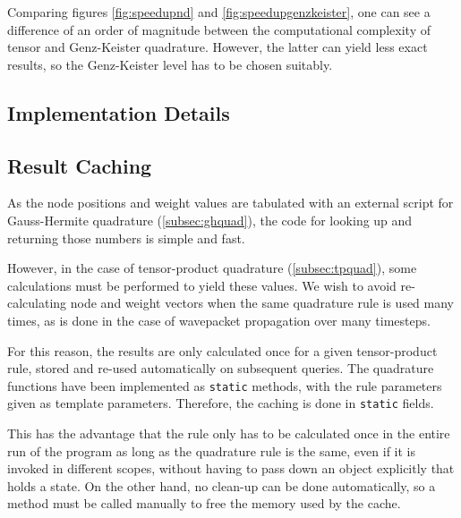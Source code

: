 Comparing figures \ref{fig:speedupnd} and \ref{fig:speedupgenzkeister}, one can
see a difference of an order of magnitude between the computational complexity
of tensor and Genz-Keister quadrature.
However, the latter can yield less exact results, so the Genz-Keister level has
to be chosen suitably.


\subsection{Implementation Details}



\subsection{Result Caching}
\label{subseq:resultcaching}

As the node positions and weight values are tabulated with an external script
for Gauss-Hermite quadrature (\ref{subsec:ghquad}), the code for looking up and
returning those numbers is simple and fast.

However, in the case of tensor-product quadrature (\ref{subsec:tpquad}), some
calculations must be performed to yield these values.
We wish to avoid re-calculating node and weight vectors when the same quadrature
rule is used many times, as is done in the case of wavepacket propagation over
many timesteps.

For this reason, the results are only calculated once for a given tensor-product
rule, stored and re-used automatically on subsequent queries.
The quadrature functions have been implemented as \texttt{static} methods, with
the rule parameters given as template parameters.
Therefore, the caching is done in \texttt{static} fields.

This has the advantage that the rule only has to be calculated once in the
entire run of the program as long as the quadrature rule is the same, even if it
is invoked in different scopes, without having to pass down an object explicitly
that holds a state.
On the other hand, no clean-up can be done automatically, so a method must be
called manually to free the memory used by the cache.
